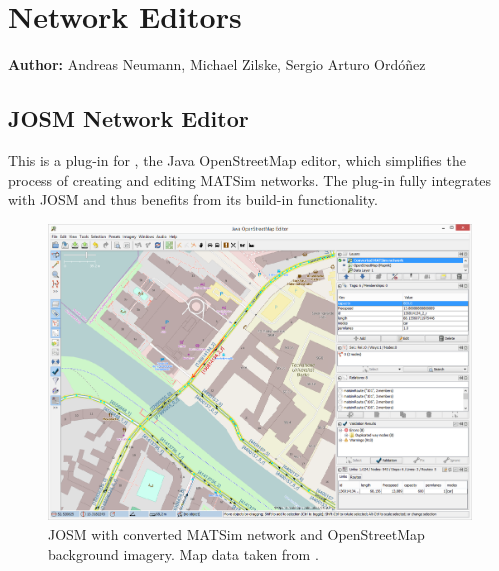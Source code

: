 \chapter{Network Editors}
\label{ch:networkeditor}

\hfill \textbf{Author:} Andreas Neumann, Michael Zilske, Sergio Arturo Ordóñez


\section{JOSM Network Editor}
This is a plug-in for \citet[][]{JOSM2014}, the Java OpenStreetMap editor, which simplifies the process of creating and editing MATSim networks. The plug-in fully integrates with JOSM and thus benefits from its build-in functionality.

\begin{figure}
\centering
\includegraphics[width=0.9\linewidth]{extending/modules/networkeditor/josm_screenshot.png}
\caption{JOSM with converted MATSim network and OpenStreetMap background imagery. Map data taken from \citet[][]{OpenStreetMap2014}.}
\label{fig:networkeditor_screenshot}
\end{figure}


